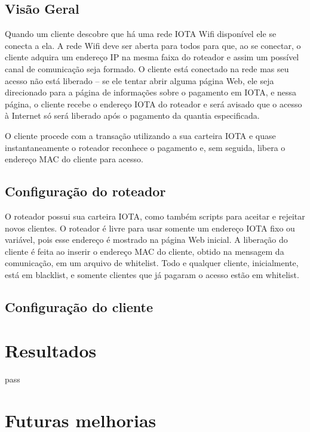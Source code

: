 \documentclass{article}
\begin{document}
\subsection{Visão Geral}

Quando um cliente descobre que há uma rede IOTA Wifi disponível ele se conecta a ela. A rede Wifi deve ser aberta para todos
para que, ao se conectar, o cliente adquira um endereço IP na mesma faixa do roteador e assim um possível canal de
comunicação seja formado. O cliente está conectado na rede mas seu acesso não está liberado -- se ele tentar abrir alguma
página Web, ele seja direcionado para a página de informações sobre o pagamento em IOTA, e nessa página, o cliente recebe
o endereço IOTA do roteador e será avisado que o acesso à Internet só será liberado após o pagamento da quantia especificada.

O cliente procede com a transação utilizando a sua carteira IOTA e quase instantaneamente o roteador reconhece o pagamento e,
sem seguida, libera o endereço MAC do cliente para acesso.

\subsection{Configuração do roteador}

O roteador possui sua carteira IOTA, como também scripts para aceitar e rejeitar novos clientes. O roteador é livre para usar
somente um endereço IOTA fixo ou variável, pois esse endereço é mostrado na página Web inicial. A liberação do cliente é feita ao
inserir o endereço MAC do cliente, obtido na mensagem da comunicação, em um arquivo de whitelist. Todo e qualquer cliente, inicialmente,
está em blacklist, e somente clientes que já pagaram o acesso estão em whitelist.

\subsection{Configuração do cliente}

\section{Resultados}\label{sec:Output}

pass

\section{Futuras melhorias}\label{sec:Future}
\end{document}
